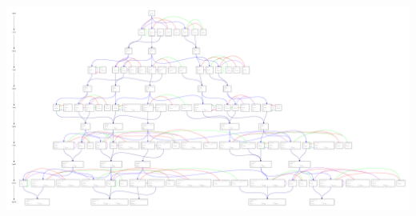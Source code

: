 \documentclass[t,11pt,handout,usenames,dvipsnames]{beamer}
\theoremstyle{plain}
\theoremstyle{definition}
\begin{document}
    \begin{frame}{}

       \vfill
        \vfill
        \includegraphics[width=\textwidth]{lifttreeC1_10.pdf}
      \end{frame}

  
\end{document}
